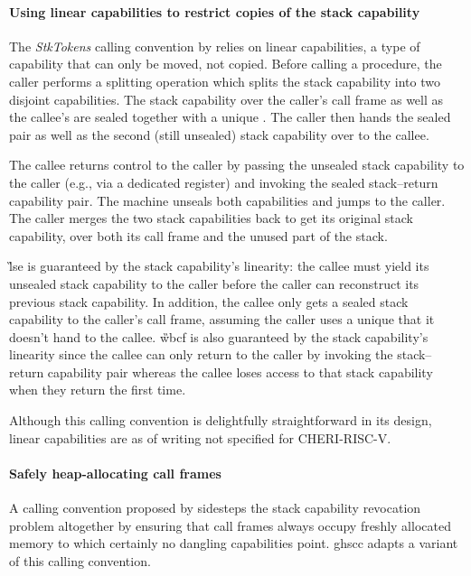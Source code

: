 \documentclass[main.tex]{subfiles}
\begin{document}
\paragraph{Using linear capabilities to restrict copies of the stack capability} The \emph{StkTokens} calling convention by \cite{stktokens} relies on linear capabilities, a type of capability that can only be moved, not copied. Before calling a procedure, the caller performs a splitting operation which splits the stack capability into two disjoint capabilities. The stack capability over the caller's call frame as well as the callee's  are sealed together with a unique . The caller then hands the sealed pair as well as the second (still unsealed) stack capability over to the callee.

The callee returns control to the caller by passing the unsealed stack capability to the caller (e.g., via a dedicated register) and invoking the sealed stack–return capability pair. The machine unseals both capabilities and jumps to the caller. The caller merges the two stack capabilities back to get its original stack capability, over both its call frame and the unused part of the stack.

\G{lse} is guaranteed by the stack capability's linearity: the callee must yield its unsealed stack capability to the caller before the caller can reconstruct its previous stack capability. In addition, the callee only gets a sealed stack capability to the caller's call frame, assuming the caller uses a unique  that it doesn't hand to the callee. \G{wbcf} is also guaranteed by the stack capability's linearity since the callee can only return to the caller by invoking the stack–return capability pair whereas the callee loses access to that stack capability when they return the first time. 

Although this calling convention is delightfully straightforward in its design, linear capabilities are as of writing not specified for CHERI-RISC-V.

\paragraph{Safely heap-allocating call frames} A calling convention proposed by \cite[section~7.3]{cerise} sidesteps the stack capability revocation problem altogether by ensuring that call frames always occupy freshly allocated memory to which certainly no dangling capabilities point. \gls{ghscc} adapts a variant of this calling convention.
\end{document}

